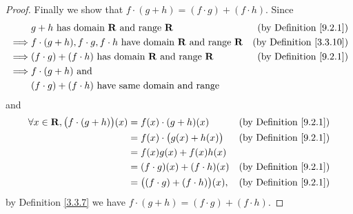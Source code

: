 \begin{proof}
    Finally we show that \(f \cdot (g + h) = (f \cdot g) + (f \cdot h)\).
    Since
    \begin{align*}
                 & g + h \text{ has domain } \mathbf{R} \text{ and range } \mathbf{R}                                   & \text{(by Definition \ref{9.2.1})}  \\
        \implies & f \cdot (g + h), f \cdot g, f \cdot h  \text{ have domain } \mathbf{R} \text{ and range } \mathbf{R} & \text{(by Definition \ref{3.3.10})} \\
        \implies & (f \cdot g) + (f \cdot h)  \text{ has domain } \mathbf{R} \text{ and range } \mathbf{R}              & \text{(by Definition \ref{9.2.1})}  \\
        \implies & f \cdot (g + h) \text{ and }                                                                                                               \\
                 & (f \cdot g) + (f \cdot h) \text{ have same domain and range}
    \end{align*}
    and
    \begin{align*}
        \forall x \in \mathbf{R}, \big(f \cdot (g + h)\big)(x) & = f(x) \cdot (g + h)(x)                   & \text{(by Definition \ref{9.2.1})} \\
                                                               & = f(x) \cdot \big(g(x) + h(x)\big)        & \text{(by Definition \ref{9.2.1})} \\
                                                               & = f(x)g(x) + f(x)h(x)                                                          \\
                                                               & = (f \cdot g)(x) + (f \cdot h)(x)         & \text{(by Definition \ref{9.2.1})} \\
                                                               & = \big((f \cdot g) + (f \cdot h)\big)(x), & \text{(by Definition \ref{9.2.1})}
    \end{align*}
    by Definition \ref{3.3.7} we have \(f \cdot (g + h) = (f \cdot g) + (f \cdot h)\).
\end{proof}